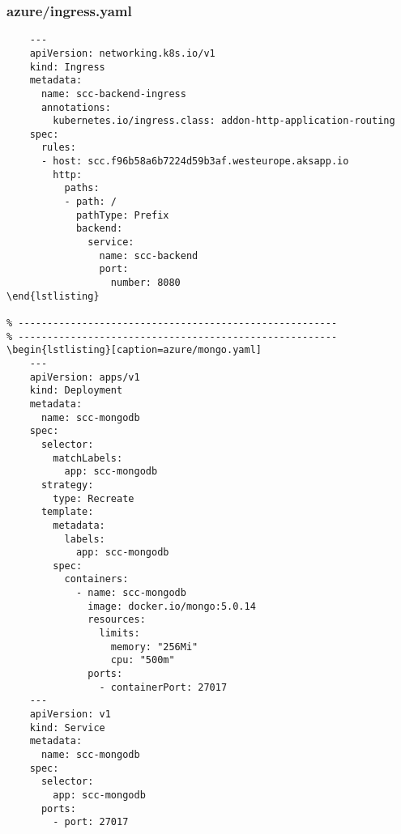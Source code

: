 \documentclass[runningheads]{llncs}
\begin{document}
\subsubsection{azure/ingress.yaml}
\begin{verbatim}
    ---
    apiVersion: networking.k8s.io/v1
    kind: Ingress
    metadata:
      name: scc-backend-ingress
      annotations:
        kubernetes.io/ingress.class: addon-http-application-routing
    spec:
      rules:
      - host: scc.f96b58a6b7224d59b3af.westeurope.aksapp.io
        http:
          paths:
          - path: /
            pathType: Prefix
            backend:
              service: 
                name: scc-backend
                port: 
                  number: 8080
\end{lstlisting}
			  
% -------------------------------------------------------
% -------------------------------------------------------
\begin{lstlisting}[caption=azure/mongo.yaml]
    ---
    apiVersion: apps/v1
    kind: Deployment
    metadata:
      name: scc-mongodb
    spec:
      selector:
        matchLabels:
          app: scc-mongodb
      strategy:
        type: Recreate
      template:
        metadata:
          labels:
            app: scc-mongodb
        spec:
          containers:
            - name: scc-mongodb
              image: docker.io/mongo:5.0.14
              resources:
                limits:
                  memory: "256Mi"
                  cpu: "500m"
              ports:
                - containerPort: 27017
    ---
    apiVersion: v1
    kind: Service
    metadata:
      name: scc-mongodb
    spec:
      selector:
        app: scc-mongodb
      ports:
        - port: 27017
\end{verbatim}

\end{document}
